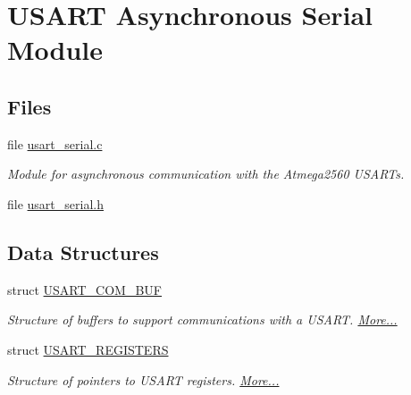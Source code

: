 \hypertarget{group__usart_async_module}{}\section{U\+S\+A\+RT Asynchronous Serial Module}
\label{group__usart_async_module}
\subsection*{Files}
\begin{DoxyCompactItemize}
\item 
file \hyperlink{usart__serial_8c}{usart\+\_\+serial.\+c}
\begin{DoxyCompactList}\small\item\em Module for asynchronous communication with the Atmega2560 U\+S\+A\+RT\textquotesingle{}s. \end{DoxyCompactList}\item 
file \hyperlink{usart__serial_8h}{usart\+\_\+serial.\+h}
\end{DoxyCompactItemize}
\subsection*{Data Structures}
\begin{DoxyCompactItemize}
\item 
struct \hyperlink{group__usart_async_module_struct_u_s_a_r_t___c_o_m___b_u_f}{U\+S\+A\+R\+T\+\_\+\+C\+O\+M\+\_\+\+B\+UF}
\begin{DoxyCompactList}\small\item\em Structure of buffers to support communications with a U\+S\+A\+RT.  \hyperlink{group__usart_async_module_struct_u_s_a_r_t___c_o_m___b_u_f}{More...}\end{DoxyCompactList}\item 
struct \hyperlink{group__usart_async_module_struct_u_s_a_r_t___r_e_g_i_s_t_e_r_s}{U\+S\+A\+R\+T\+\_\+\+R\+E\+G\+I\+S\+T\+E\+RS}
\begin{DoxyCompactList}\small\item\em Structure of pointers to U\+S\+A\+RT registers.  \hyperlink{group__usart_async_module_struct_u_s_a_r_t___r_e_g_i_s_t_e_r_s}{More...}\end{DoxyCompactList}\end{DoxyCompactItemize}
